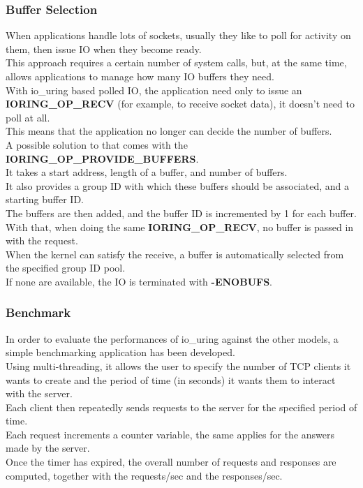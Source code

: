\documentclass[10pt, oneside,english]{article}   	%
\begin{document}
\subsubsection{Buffer Selection}
When applications handle lots of sockets, usually they like to poll for activity on them, then issue IO when they become ready. \\
This approach requires a certain number of system calls, but, at the same time, allows applications to manage how many IO buffers they need. \\
With io\_uring based polled IO, the application need only to issue an \textbf{IORING\_OP\_RECV} (for example, to receive socket data), it doesn't need to poll at all. \\
This means that the application no longer can decide the number of buffers. \\
A possible solution to that comes with the \textbf{IORING\_OP\_PROVIDE\_BUFFERS}. \\
It takes a start address, length of a buffer, and number of buffers. \\
It also provides a group ID with which these buffers should be associated, and a starting buffer ID. \\
The buffers are then added, and the buffer ID is incremented by 1 for each buffer.\\
With that, when doing the same \textbf{IORING\_OP\_RECV}, no buffer is passed in
with the request. \\
When the kernel can satisfy the receive, a buffer is automatically selected from the specified group ID pool. \\
If none are available, the IO is terminated with \textbf{-ENOBUFS}. 


\subsubsection{Benchmark}

In order to evaluate the performances of io\_uring against the other models, a simple benchmarking application has been developed. \\
Using multi-threading, it allows the user to specify the number of TCP clients it wants to create and the period of time (in seconds) it wants them to interact with the server. \\
Each client then repeatedly sends requests to the server for the specified period of time. \\
Each request increments a counter variable, the same applies for the answers made by the server. \\
Once the timer has expired, the overall number of requests and responses are computed, together with the requests/sec and the responses/sec.
\end{document}
